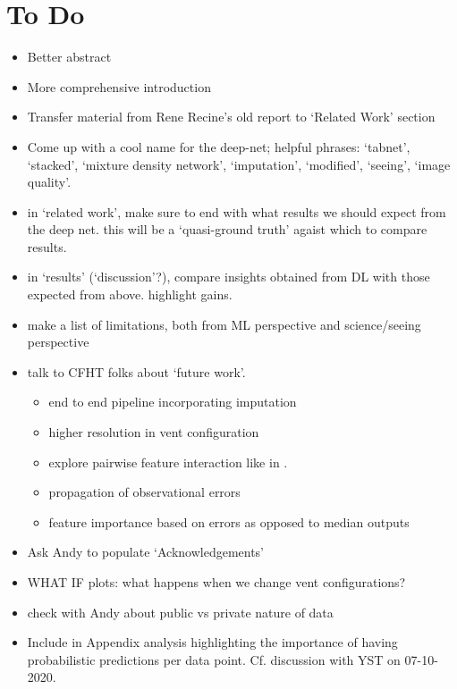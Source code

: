 
\section{To Do}\label{sec:to_do}
\begin{itemize}
    \item Better abstract
    \item More comprehensive introduction
    \item Transfer material from Rene Recine's old report to `Related Work' section
    \item Come up with a cool name for the deep-net; helpful phrases: `tabnet', `stacked', `mixture density network', `imputation', `modified', `seeing', `image quality'.
    \item in `related work', make sure to end with what results we should expect from the deep net. this will be a `quasi-ground truth' agaist which to compare results.
    \item in `results' (`discussion'?), compare insights obtained from DL with those expected from above. highlight gains.
    \item make a list of limitations, both from ML perspective and science/seeing perspective
    \item talk to CFHT folks about `future work'.
    \begin{itemize}
        \item end to end pipeline incorporating imputation
        \item higher resolution in vent configuration
        \item explore pairwise feature interaction like in \cite{shap1, shap2}.
        \item propagation of observational errors
        \item feature importance based on errors as opposed to median outputs
    \end{itemize}
    \item Ask Andy to populate `Acknowledgements'
    \item WHAT IF plots: what happens when we change vent configurations?
    \item check with Andy about public vs private nature of data
    \item Include in Appendix analysis highlighting the importance of having probabilistic predictions per data point. Cf. discussion with YST on 07-10-2020.
\end{itemize}
